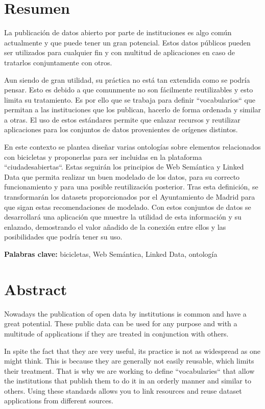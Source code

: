 \chapter{Resumen}

La publicación de datos abierto por parte de instituciones es algo común actualmente y que puede tener un gran potencial. Estos datos públicos pueden ser utilizados para cualquier fin y con multitud de aplicaciones en caso de tratarlos conjuntamente con otros.


Aun siendo de gran utilidad, su práctica no está tan extendida como se podría pensar. Esto es debido a que comunmente no son fácilmente reutilizables y esto limita su tratamiento. Es por ello que se trabaja para definir ``vocabularios`` que permitan a las instituciones que los publican, hacerlo de forma ordenada y similar a otras. El uso de estos estándares permite que enlazar recursos y reutilizar aplicaciones para los conjuntos de datos provenientes de orígenes distintos.


En este contexto se plantea diseñar varias ontologías sobre elementos relacionados con bicicletas y proponerlas para ser incluidas en la plataforma ``ciudadesabiertas``. Estas seguirán los principios de Web Semántica y Linked Data que permita realizar un buen modelado de los datos, para su correcto funcionamiento y para una posible reutilización posterior. Tras esta definición, se transformarán los datasets proporcionados por el Ayuntamiento de Madrid para que sigan estas recomendaciones de modelado. Con estos conjuntos de datos se desarrollará una aplicación que muestre la utilidad de esta información y su enlazado, demostrando el valor añadido de la conexión entre ellos y las posibilidades que podría tener su uso.
\newline

\textbf{Palabras clave:} bicicletas, Web Semántica, Linked Data, ontología







\chapter{Abstract}

Nowadays the publication of open data by institutions is common and have a great potential. These public data can be used for any purpose and with a multitude of applications if they are treated in conjunction with others.


In spite the fact that they are very useful, its practice is not as widespread as one might think. This is because they are generally not easily reusable, which limits their treatment. That is why we are working to define ``vocabularies`` that allow the institutions that publish them to do it in an orderly manner and similar to others. Using these standards allows you to link resources and reuse dataset applications from different sources.


